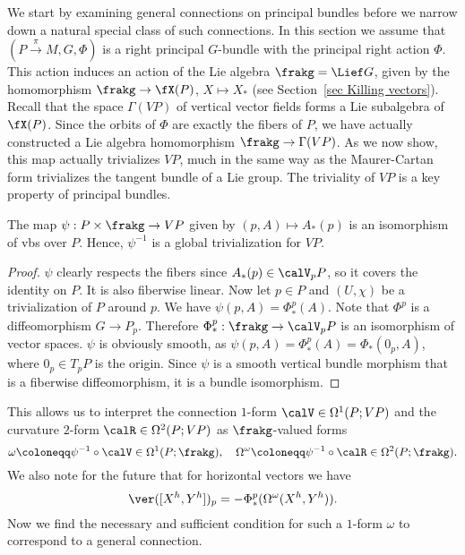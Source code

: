 We start by examining general connections on principal bundles before we narrow down a natural special class of such connections. In this section we assume that $(P\overset{\pi}{\to}M,G,\Phi)$ is a right principal $G$-bundle with the principal right action $\Phi$. This action induces an action of the Lie algebra $\frakg=\Lief G$, given by the homomorphism $\frakg\to \fX(P)$, $X\mapsto X_\ast$ (see Section~\ref{sec Killing vectors}). Recall that the space $\Gamma(VP)$ of vertical vector fields forms a Lie subalgebra of $\fX(P)$. Since the orbits of $\Phi$ are exactly the fibers of $P$, we have actually constructed a Lie algebra homomorphism $\frakg\to \Gamma(VP)$. As we now show, this map actually trivializes $VP$, much in the same way as the Maurer-Cartan form trivializes the tangent bundle of a Lie group. The triviality of $VP$ is a key property of principal bundles.

\begin{prop}[{{\cite[Lem.~1.3.1]{RS2}}}]\label{lem 1.3.1 RS2}
    The map $\psi:P\times\frakg\to VP$ given by $(p,A)\mapsto A_\ast(p)$ is an isomorphism of \glspl{vb} over $P$. Hence, $\psi^{-1}$ is a global trivialization for $VP$.
\end{prop}
\begin{proof}
    $\psi$ clearly respects the fibers since $A_\ast(p)\in \calV_pP$, so it covers the identity on $P$. It is also fiberwise linear. Now let $p\in P$ and $(U,\chi)$ be a trivialization of $P$ around $p$. We have $\psi(p,A)=\Phi^p_{\ast}(A)$. Note that $\Phi^p$ is a diffeomorphism $G\to P_p$. Therefore $\Phi^{p}_\ast:\frakg\to \calV_pP$ is an isomorphism of vector spaces. $\psi$ is obviously smooth, as $\psi(p,A)=\Phi^p_\ast(A)=\Phi_\ast(0_p,A)$, where $0_p\in T_pP$ is the origin. Since $\psi$ is a smooth vertical bundle morphism that is a fiberwise diffeomorphism, it is a bundle isomorphism.
\end{proof}

This allows us to interpret the connection $1$-form $\calV\in\Omega^1(P;VP)$ and the curvature $2$-form $\calR\in \Omega^2(P;VP)$ as $\frakg$-valued forms
\[\omega\coloneqq \psi^{-1}\circ \calV \in\Omega^1(P;\frakg),\quad \Omega^\omega\coloneqq \psi^{-1}\circ \calR\in \Omega^2(P;\frakg).\]
We also note for the future that for horizontal vectors we have
\[\ver([X^h,Y^h])_p=-\Phi^p_\ast(\Omega^\omega(X^h,Y^h)).\label{eq 1.4.5 RS2}\]
Now we find the necessary and sufficient condition for such a $1$-form $\omega$ to correspond to a general connection.

